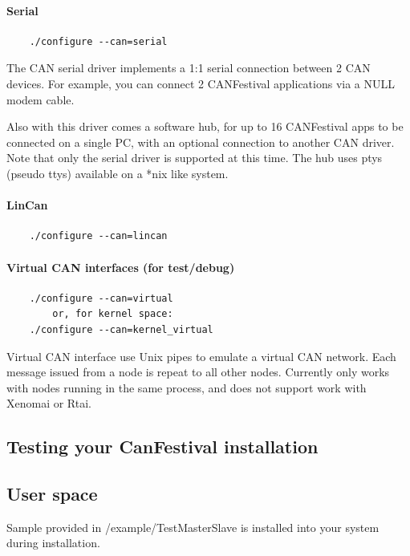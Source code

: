 \documentclass[12pt,english,a4paper]{book}
\begin{document}
\paragraph{Serial}


\begin{verbatim}
	./configure --can=serial
\end{verbatim}

The CAN serial driver implements a 1:1 serial connection between 2 CAN devices.
For example, you can connect 2 CANFestival applications via a NULL modem cable.

Also with this driver comes a software hub, for up to 16 CANFestival apps to 
be connected on a single PC, with an optional connection to another CAN driver.
Note that only the serial driver is supported at this time.  The hub uses ptys 
(pseudo ttys) available on a *nix like system.


\paragraph{LinCan}


\begin{verbatim}
	./configure --can=lincan
\end{verbatim}


\paragraph{Virtual CAN interfaces (for test/debug)}


\begin{verbatim}
	./configure --can=virtual
		or, for kernel space:
	./configure --can=kernel_virtual
\end{verbatim}


Virtual CAN interface use Unix pipes to emulate a virtual CAN network.
Each message issued from a node is repeat to all other nodes. Currently
only works with nodes running in the same process, and does not support
work with Xenomai or Rtai.


\subsection{Testing your CanFestival installation}

\subsection{User space}

Sample provided in /example/TestMasterSlave is installed into your
system during installation.
\end{document}
